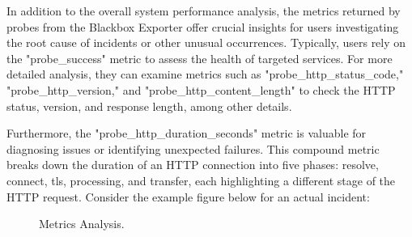 In addition to the overall system performance analysis, the metrics returned by probes from the Blackbox Exporter offer crucial insights for users investigating the root cause of incidents or other unusual occurrences. Typically, users rely on the "probe\_success" metric to assess the health of targeted services. For more detailed analysis, they can examine metrics such as "probe\_http\_status\_code," "probe\_http\_version," and "probe\_http\_content\_length" to check the HTTP status, version, and response length, among other details. 

Furthermore, the "probe\_http\_duration\_seconds" metric is valuable for diagnosing issues or identifying unexpected failures. This compound metric breaks down the duration of an \ac{HTTP} connection into five phases: resolve, connect, tls, processing, and transfer, each highlighting a different stage of the \ac{HTTP} request. Consider the example figure below for an actual incident: 

\begin{figure}[htpb]
  \centering
  \datatable

  \caption[Metrics Analysis]{Metrics Analysis.}\label{fig:metrics-analysis}
\end{figure}

